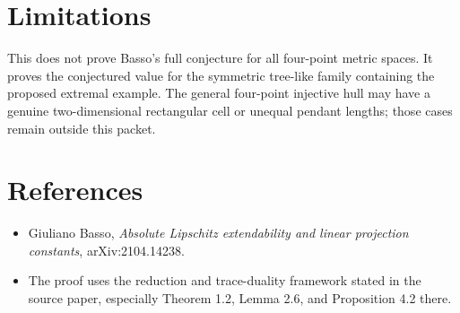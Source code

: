 \documentclass[11pt]{article}
\begin{document}
\section*{Limitations}

This does not prove Basso's full conjecture for all four-point metric spaces.
It proves the conjectured value for the symmetric tree-like family containing
the proposed extremal example.  The general four-point injective hull may have
a genuine two-dimensional rectangular cell or unequal pendant lengths; those
cases remain outside this packet.

\section*{References}

\begin{itemize}
\item Giuliano Basso, \emph{Absolute Lipschitz extendability and linear
projection constants}, arXiv:2104.14238.
\item The proof uses the reduction and trace-duality framework stated in the
source paper, especially Theorem 1.2, Lemma 2.6, and Proposition 4.2 there.
\end{itemize}
\end{document}

